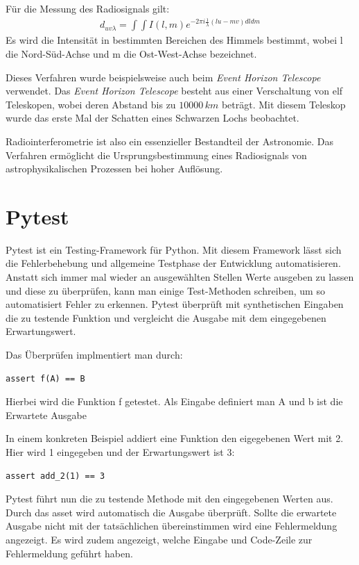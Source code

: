 \documentclass[]{dsadokumentation}
\begin{document}
Für die Messung des Radiosignals gilt:
\begin{eqnarray}
d_{uv\lambda} =\int\int I(l,m)e^{-2\pi i \frac{1}{\lambda}(lu-mv)dldm}
\end{eqnarray}
Es wird die Intensität in bestimmten Bereichen des Himmels bestimmt, wobei l die Nord-Süd-Achse und m die Ost-West-Achse bezeichnet.

Dieses Verfahren wurde beispielsweise auch beim \emph{Event Horizon Telescope} verwendet. Das \emph{Event Horizon Telescope} besteht aus einer Verschaltung von elf Teleskopen, wobei deren Abstand bis zu $10000\,km$ beträgt. Mit diesem Teleskop wurde das erste Mal der Schatten eines Schwarzen Lochs beobachtet.

Radiointerferometrie ist also ein essenzieller Bestandteil der Astronomie. Das Verfahren ermöglicht die Ursprungsbestimmung eines Radiosignals von astrophysikalischen Prozessen bei hoher Auflösung.

\section{Pytest}
Pytest ist ein Testing-Framework für Python. Mit diesem Framework lässt sich die Fehlerbehebung und allgemeine Testphase der Entwicklung automatisieren. Anstatt sich immer mal wieder an ausgewählten Stellen Werte ausgeben zu lassen und diese zu überprüfen, kann man einige Test-Methoden schreiben, um so automatisiert Fehler zu erkennen. Pytest überprüft mit synthetischen Eingaben die zu testende Funktion und vergleicht die Ausgabe mit dem eingegebenen Erwartungswert.

Das Überprüfen implmentiert man durch:

\begin{verbatim}
assert f(A) == B
\end{verbatim}

Hierbei wird die Funktion f getestet. Als Eingabe definiert man A und b ist die Erwartete Ausgabe

In einem konkreten Beispiel addiert eine Funktion den eigegebenen Wert mit 2. Hier wird 1 eingegeben und der Erwartungswert ist 3:

\begin{verbatim}
assert add_2(1) == 3
\end{verbatim}

Pytest führt nun die zu testende Methode mit den eingegebenen Werten aus. Durch das asset wird automatisch die Ausgabe überprüft. Sollte die erwartete Ausgabe nicht mit der tatsächlichen übereinstimmen wird eine Fehlermeldung angezeigt. Es wird zudem angezeigt, welche Eingabe und Code-Zeile zur Fehlermeldung geführt haben.
\end{document}
